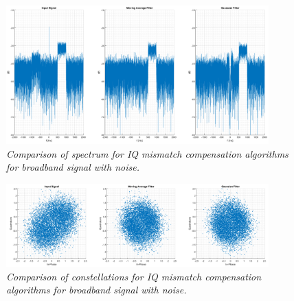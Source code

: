 \documentclass[en,printmode]{mgr}
\begin{document}
			\begin{figure}[!htb]
    			\centering
   				\includegraphics[width=0.9\textwidth]{plots/band_nf2.png}
   		 		\caption{\textit{Comparison of spectrum for IQ mismatch compensation algorithms for
   		 		broadband signal with noise.}}
   		 	\end{figure}	
   		 	\begin{figure}[!htb]
    			\centering
   				\includegraphics[width=0.9\textwidth]{plots/band_nc2.png}
   		 		\caption{\textit{Comparison of constellations for IQ mismatch compensation algorithms 
   		 		for broadband signal with noise.}}
   		 	\end{figure}
\end{document}
